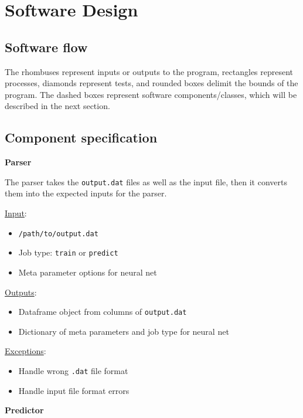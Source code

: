 \documentclass[paper=a4, fontsize=12pt]{article}
\begin{document}

\section*{Software Design}

\newpage

\subsection*{Software flow}



The rhombuses represent inputs or outputs to the program,
rectangles represent processes,
diamonds represent tests,
and rounded boxes delimit the bounds of the program.
The dashed boxes represent software components/classes, which will be described in the next section.

\subsection*{Component specification}

{\noindent \large \textbf{Parser} }

The parser takes the \texttt{output.dat} files as well as the input file,
then it converts them into the expected inputs for the parser. 
 
\underline{Input}:
\begin{itemize}
  \item \texttt{/path/to/output.dat}
  \item Job type: \texttt{train} or \texttt{predict}
  \item Meta parameter options for neural net
\end{itemize}

\underline{Outputs}:
\begin{itemize}
  \item Dataframe object from columns of \texttt{output.dat}
  \item Dictionary of meta parameters and job type for neural net
\end{itemize}

\underline{Exceptions}:
\begin{itemize}
  \item Handle wrong \texttt{.dat} file format
  \item Handle input file format errors
\end{itemize}


{\noindent \large \textbf{Predictor} }
\end{document}

